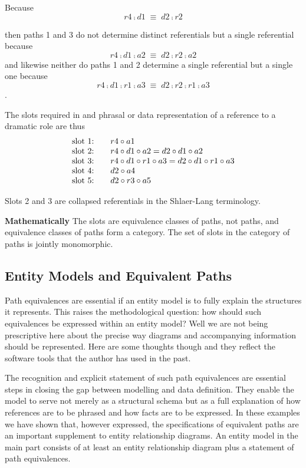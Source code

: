 Because 
\begin{equation}
r4 \comp d1 \;\equiv\; d2 \comp r2
\end{equation}

then paths 1 and 3 do not determine distinct referentials but a single referential because
\begin{equation}
r4 \comp d1 \comp a2 \;\equiv\; d2 \comp r2 \comp a2
\end{equation}
and likewise neither do paths 1 and 2 determine a single referential but a single one because
\begin{equation}
r4 \comp d1 \comp r1 \comp a3 \;\equiv\; d2 \comp r2 \comp r1 \comp a3
\end{equation}.

The slots required in and phrasal or data representation of a reference to a dramatic role are thus
\begin{displaymath}
\begin{array}{l c l}
\text{slot 1:} &  & r4 \circ a1 \\
\text{slot 2:} &  & r4 \circ d1 \circ a2 = d2 \circ d1 \circ a2 \\
\text{slot 3:} &  & r4 \circ d1 \circ r1 \circ a3 = d2 \circ d1 \circ r1 \circ a3 \\
\text{slot 4:} &  & d2 \circ a4 \\
\text{slot 5:} &  & d2 \circ r3 \circ a5
\end{array}
\end{displaymath}

Slots 2 and  3 are collapsed referentials in the Shlaer-Lang terminology.

\textbf{Mathematically}
The slots are equivalence classes of paths, not paths, and equivalence classes of paths form a category.
The set of slots in the category of paths is jointly monomorphic.

\subsection{Entity Models and Equivalent Paths}
\begin{worktt}
Path equivalences are essential if an entity model is to fully explain the structures it represents. 
This raises the methodological question: how should such equivalences be expressed within an entity model? 
Well we are not being prescriptive here about the precise way diagrams and accompanying information should be represented. Here are some thoughts though and they reflect the software tools that the author has used in the past.
\end{worktt} 
\mynote {}
The recognition and explicit statement of such path equivalences are essential steps in closing the gap between modelling and data definition. They enable the model to serve not merely as a structural schema but as a full explanation of how references are to be phrased and how facts are to be expressed.
\mynote
In these examples we have shown that, however expressed,  the specifications of equivalent paths are
an important supplement to entity relationship diagrams. 
An entity model in the main part consists of at least an entity relationship diagram  
plus a statement of path equivalences.


